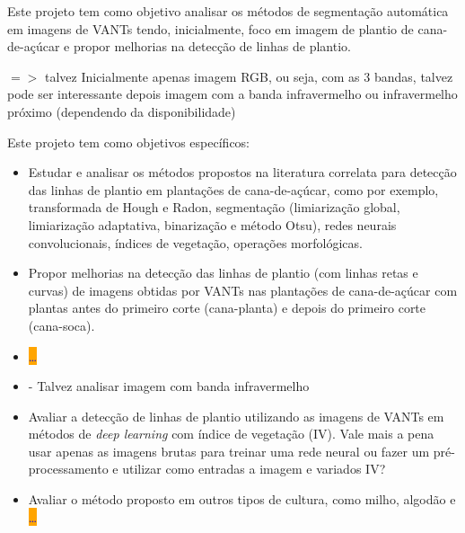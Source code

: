 \documentclass[12pt, a4paper, english, brazil]{article}
\newcommand{\textRed}[1]{{{\color{red} #1}}}
\newcommand{\dotsBlue}{\colorbox{orange}{\textcolor{blue}{\dots}}}
\begin{document}
Este projeto tem como objetivo analisar os métodos de segmentação automática em imagens de VANTs tendo, inicialmente, foco em imagem de plantio de cana-de-açúcar e propor melhorias na detecção de linhas de plantio. 

$=>$ \textRed{talvez} Inicialmente apenas imagem RGB, ou seja, com as 3 bandas, talvez pode ser interessante depois imagem com a banda infravermelho ou infravermelho próximo (dependendo da disponibilidade)

Este projeto tem como objetivos específicos:
\begin{itemize}
    \item Estudar e analisar os métodos propostos na literatura correlata para detecção das linhas de plantio em plantações de cana-de-açúcar, como por exemplo, transformada de Hough e Radon, segmentação (limiarização global, limiarização adaptativa, binarização e método Otsu), redes neurais convolucionais, índices de vegetação, operações morfológicas.

    \item Propor melhorias na detecção das linhas de plantio (com linhas retas e curvas) de imagens obtidas por VANTs nas plantações de cana-de-açúcar com plantas antes do primeiro corte (cana-planta) e depois do primeiro corte (cana-soca).

    \item \dotsBlue

    \item - \textRed{Talvez analisar imagem com banda infravermelho}

    \item Avaliar a detecção de linhas de plantio utilizando as imagens de VANTs em métodos de \textit{deep learning} com índice de vegetação (IV). Vale mais a pena usar apenas as imagens brutas para treinar uma rede neural ou fazer um pré-processamento e utilizar como entradas a imagem e variados IV?

    \item Avaliar o método proposto em outros tipos de cultura, como milho, algodão e \dotsBlue
\end{itemize}

\end{document}
